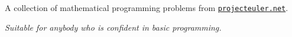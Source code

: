 %
%
%

\newif\ifprint
\printtrue



\newcommand{\workshopTitle}{Activity 2: Project Euler}

\newcommand{\workshopAuthor}{}



	
	
	A collection of mathematical programming problems from \href{https://projecteuler.net/}{\texttt{projecteuler.net}}.
	
	\textit{Suitable for anybody who is confident in basic programming.}
	
	\tableofcontents
	\vspace{12pt}
	
	
	
	\webclearpage
	
	\webclearpage
	
	\webclearpage
	
	
